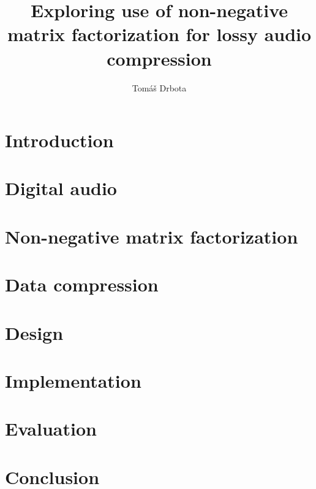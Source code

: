 \documentclass[thesis=M,english,hidelinks]{FITthesis}[2018/03/12]
\title{Exploring use of non-negative matrix factorization for lossy audio compression}
\author{Tomáš Drbota} %
\begin{document}
	

\chapter{Introduction}


\chapter{Digital audio}


\chapter{Non-negative matrix factorization}


\chapter{Data compression}


\chapter{Design}


\chapter{Implementation}


\chapter{Evaluation}


\chapter{Conclusion}





\appendix
\end{document}
